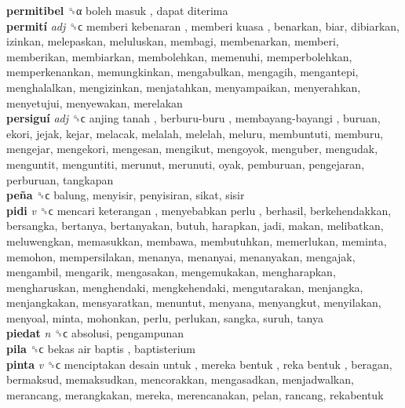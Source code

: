 \textbf{permitibel} ␝α   boleh masuk ,  dapat diterima   \\
\textbf{permití} \emph{adj}  ␝ϲ   memberi kebenaran ,  memberi kuasa , benarkan, biar, dibiarkan, izinkan, melepaskan, meluluskan, membagi, membenarkan, memberi, memberikan, membiarkan, membolehkan, memenuhi, memperbolehkan, memperkenankan, memungkinkan, mengabulkan, mengagih, mengantepi, menghalalkan, mengizinkan, menjatahkan, menyampaikan, menyerahkan, menyetujui, menyewakan, merelakan  \\
\textbf{persiguí} \emph{adj}  ␝ϲ   anjing tanah ,  berburu-buru ,  membayang-bayangi , buruan, ekori, jejak, kejar, melacak, melalah, melelah, meluru, membuntuti, memburu, mengejar, mengekori, mengesan, mengikut, mengoyok, menguber, mengudak, menguntit, menguntiti, merunut, merunuti, oyak, pemburuan, pengejaran, perburuan, tangkapan  \\
\textbf{peña} ␝ϲ  balung, menyisir, penyisiran, sikat, sisir  \\
\textbf{pidi} \emph{v}  ␝ϲ   mencari keterangan ,  menyebabkan perlu , berhasil, berkehendakkan, bersangka, bertanya, bertanyakan, butuh, harapkan, jadi, makan, melibatkan, meluwengkan, memasukkan, membawa, membutuhkan, memerlukan, meminta, memohon, mempersilakan, menanya, menanyai, menanyakan, mengajak, mengambil, mengarik, mengasakan, mengemukakan, mengharapkan, mengharuskan, menghendaki, mengkehendaki, mengutarakan, menjangka, menjangkakan, mensyaratkan, menuntut, menyana, menyangkut, menyilakan, menyoal, minta, mohonkan, perlu, perlukan, sangka, suruh, tanya  \\
\textbf{piedat} \emph{n}  ␝ϲ  absolusi, pengampunan  \\
\textbf{pila} ␝ϲ   bekas air baptis , baptisterium  \\
\textbf{pinta} \emph{v}  ␝ϲ   menciptakan desain untuk ,  mereka bentuk ,  reka bentuk , beragan, bermaksud, memaksudkan, mencorakkan, mengasadkan, menjadwalkan, merancang, merangkakan, mereka, merencanakan, pelan, rancang, rekabentuk  \\
